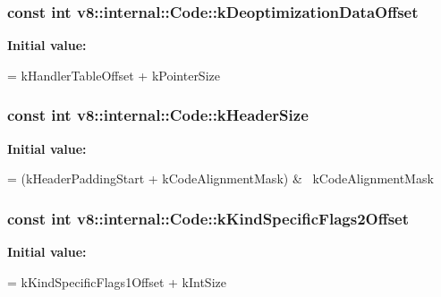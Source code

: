 \subsubsection[{\texorpdfstring{k\+Deoptimization\+Data\+Offset}{kDeoptimizationDataOffset}}]{\setlength{\rightskip}{0pt plus 5cm}const int v8\+::internal\+::\+Code\+::k\+Deoptimization\+Data\+Offset\hspace{0.3cm}{\ttfamily [static]}}\hypertarget{classv8_1_1internal_1_1_code_ae96feb908e13cef0ff94020a8b3d2692}{}\label{classv8_1_1internal_1_1_code_ae96feb908e13cef0ff94020a8b3d2692}
{\bfseries Initial value\+:}
\begin{DoxyCode}
=
      kHandlerTableOffset + kPointerSize
\end{DoxyCode}
\subsubsection[{\texorpdfstring{k\+Header\+Size}{kHeaderSize}}]{\setlength{\rightskip}{0pt plus 5cm}const int v8\+::internal\+::\+Code\+::k\+Header\+Size\hspace{0.3cm}{\ttfamily [static]}}\hypertarget{classv8_1_1internal_1_1_code_abfc7192bae05436fc229b94bbab81648}{}\label{classv8_1_1internal_1_1_code_abfc7192bae05436fc229b94bbab81648}
{\bfseries Initial value\+:}
\begin{DoxyCode}
=
      (kHeaderPaddingStart + kCodeAlignmentMask) & ~kCodeAlignmentMask
\end{DoxyCode}
\subsubsection[{\texorpdfstring{k\+Kind\+Specific\+Flags2\+Offset}{kKindSpecificFlags2Offset}}]{\setlength{\rightskip}{0pt plus 5cm}const int v8\+::internal\+::\+Code\+::k\+Kind\+Specific\+Flags2\+Offset\hspace{0.3cm}{\ttfamily [static]}}\hypertarget{classv8_1_1internal_1_1_code_a312ff3415cd017ab9871db506fa39b6d}{}\label{classv8_1_1internal_1_1_code_a312ff3415cd017ab9871db506fa39b6d}
{\bfseries Initial value\+:}
\begin{DoxyCode}
=
      kKindSpecificFlags1Offset + kIntSize
\end{DoxyCode}
